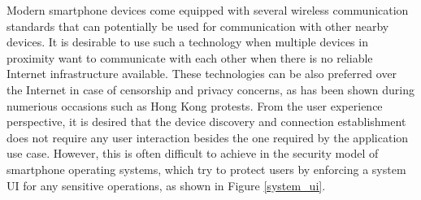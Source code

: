 Modern smartphone devices come equipped with several wireless communication standards that can potentially be used for communication with other nearby devices. It is desirable to use such a technology when multiple devices in proximity want to communicate with each other when there is no reliable Internet infrastructure available. These technologies can be also preferred over the Internet in case of censorship and privacy concerns, as has been shown during numerious occasions such as Hong Kong protests. From the user experience perspective, it is desired that the device discovery and connection establishment does not require any user interaction besides the one required by the application use case. However, this is often difficult to achieve in the security model of smartphone operating systems, which try to protect users by enforcing a system UI for any sensitive operations, as shown in Figure \ref{system_ui}.

